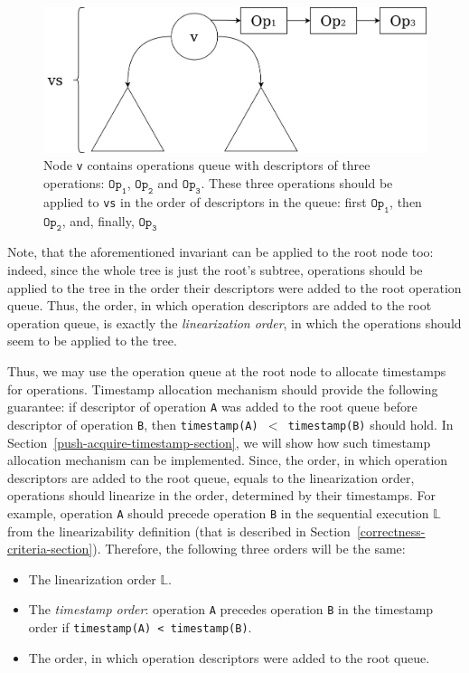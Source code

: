 \documentclass[times, dvipsnames,%
               languages={russian,english} %
              ]{itmo-student-thesis}
\begin{document}
\begin{figure}[H]
  \centering
  \caption{Node \texttt{v} contains operations queue with descriptors of three operations: $\texttt{Op}_{\texttt{1}}$, $\texttt{Op}_{\texttt{2}}$ and $\texttt{Op}_{\texttt{3}}$. These three operations should be applied to \texttt{vs} in the order of descriptors in the queue: first $\texttt{Op}_{\texttt{1}}$, then $\texttt{Op}_{\texttt{2}}$, and, finally, $\texttt{Op}_{\texttt{3}}$}
  \label{main-invariant-pic}
  \includegraphics[width=\linewidth]{pics/main-invariant.png}
\end{figure}

Note, that the aforementioned invariant can be applied to the root node too: indeed, since the whole tree is just the root's subtree, operations should be applied to the tree in the order their descriptors were added to the root operation queue. Thus, the order, in which operation descriptors are added to the root operation queue, is exactly the \emph{linearization order}, in which the operations should seem to be applied to the tree.

Thus, we may use the operation queue at the root node to allocate timestamps for operations. Timestamp allocation mechanism should provide the following guarantee: if descriptor of operation \texttt{A} was added to the root queue before descriptor of operation \texttt{B}, then \texttt{timestamp(A) $<$ timestamp(B)} should hold. In Section~\ref{push-acquire-timestamp-section}, we will show how such timestamp allocation mechanism can be implemented. Since, the order, in which operation descriptors are added to the root queue, equals to the linearization order, operations should linearize in the order, determined by their timestamps. For example, operation \texttt{A} should precede operation \texttt{B} in the sequential execution $\mathbb{L}$ from the linearizability definition (that is described in Section~\ref{correctness-criteria-section}). Therefore, the following three orders will be the same:

\begin{itemize}
    \item The linearization order $\mathbb{L}$.
    
    \item The \emph{timestamp order}: operation \texttt{A} precedes operation \texttt{B} in the timestamp order if \texttt{timestamp(A) < timestamp(B)}.
    
    \item The order, in which operation descriptors were added to the root queue.
\end{itemize}
\end{document}
